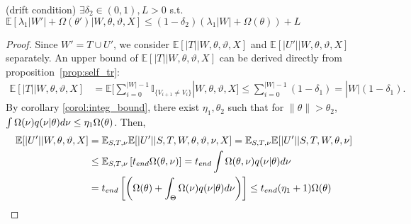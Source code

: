 \begin{lemma}(drift condition) $\exists \delta_2 \in (0, 1), L > 0$
  s.t.
  $\mathbb{E}\left[\lambda_1|W'| + \Omega(\theta')  | W, \theta, \vartheta, X\right]
  \leq (1 - \delta_2)\left(\lambda_1|W| + \Omega(\theta)   \right) + L$ %
\label{lem:drift}
\end{lemma}
\begin{proof}
Since $W'=T\cup U'$, we consider $\mathbb{E}[|T| |W,\theta,\vartheta,X]$
and $\mathbb{E}[|U'| | W, \theta, \vartheta, X]$ separately.
An upper bound of $\mathbb{E}[|T| | W,\theta,\vartheta, X]$ can be derived
directly from proposition~\ref{prop:self_tr}:
\begin{align*}
\mathbb{E}[|T| |W,\theta,\vartheta,X] &= \mathbb{E}[\sum_{i = 0}^{|W|-1}
  \mathbb{I}_{\{ V_{i + 1} \neq V_i \}}| W, \theta, \vartheta, X]
\leq \sum_{i = 0}^{|W| - 1} (1 - \delta_1) = |W|(1 - \delta_1).
\end{align*}
By corollary \ref{corol:integ_bound}, there exist $\eta_1 , \theta_2$ 
such that for 
$ \| \theta \| > \theta_2$, 
 $ \int \Omega(\nu) q(\nu | \theta)d\nu \leq \eta_1 \Omega(\theta) 
 $. Then,
\begin{align*}
\mathbb{E}[|U'| |W, \theta, \vartheta, X] &= 
\mathbb{E}_{S,T, \ptheta}\mathbb{E}[|U'| | S, T, W, \theta, \vartheta, \ptheta, X] = \mathbb{E}_{S,T, \ptheta}\mathbb{E}[|U'| | S, T, W, \theta, \ptheta] \\
& \leq \mathbb{E}_{S,T, \ptheta} \left[t_{end}\Omega(\theta, \ptheta)\right] = t_{end}\int \Omega(\theta, \ptheta) q(\ptheta | \theta) d\ptheta\\
& = t_{end} \left[ \left(  \Omega(\theta) +
\int_\Theta \Omega(\ptheta) q(\ptheta | \theta)d\ptheta \right) \right] 
 \leq t_{end} (\eta_1 + 1) \Omega(\theta) %
\end{align*}

\end{proof}
